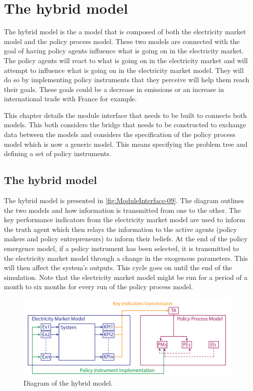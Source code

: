 \section{The hybrid model}
\label{sec:CodeDocHybrid}

The hybrid model is the a model that is composed of both the electricity market model and the policy process model. These two models are connected with the goal of having policy agents influence what is going on in the electricity market. The policy agents will react to what is going on in the electricity market and will attempt to influence what is going on in the electricity market model. They will do so by implementing policy instruments that they perceive will help them reach their goals. These goals could be a decrease in emissions or an increase in international trade with France for example.

This chapter details the module interface that needs to be built to connects both models. This both considers the bridge that needs to be constructed to exchange data between the models and considers the specification of the policy process model which is now a generic model. This means specifying the problem tree and defining a set of policy instruments.

\subsection{The hybrid model}
\label{ssec:hybridModel}

The hybrid model is presented in \autoref{fig:ModuleInterface-09}. The diagram outlines the two models and how information is transmitted from one to the other. The key performance indicators from the electricity market model are used to inform the truth agent which then relays the information to the active agents (policy makers and policy entrepreneurs) to inform their beliefs. At the end of the policy emergence model, if a policy instrument has been selected, it is transmitted to the electricity market model through a change in the exogenous parameters. This will then affect the system's outputs. This cycle goes on until the end of the simulation. Note that the electricity market model might be run for a period of a month to six months for every run of the policy process model.

\begin{figure}
\centering
\includegraphics[width=\linewidth, keepaspectratio]{figures/ModuleInterface-09}
\caption{Diagram of the hybrid model.}
\label{fig:ModuleInterface-09}
\end{figure}

